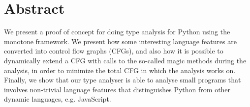 \chapter*{Abstract}
We present a proof of concept for doing type analysis for Python using the monotone framework. We present how some interesting language features are converted into control flow graphs (CFGs), and also how it is possible to dynamically extend a CFG with calls to the so-called magic methods during the analysis, in order to minimize the total CFG in which the analysis works on. Finally, we show that our type analyser is able to analyse small programs that involves non-trivial language features that distinguishes Python from other dynamic languages, e.g. JavaScript.